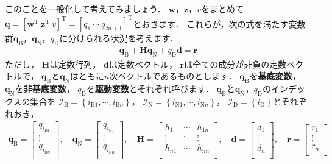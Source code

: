 \documentclass[a4paper]{jsarticle}
\begin{document}
このことを一般化して考えてみましょう．
$\boldsymbol{w}$，$\boldsymbol{z}$，$v$をまとめて
$\boldsymbol{q}=[\boldsymbol{w}^{\mathrm{T}}~\boldsymbol{z}^{\mathrm{T}}~v]^{\mathrm{T}}=[q_{1}~\cdots~q_{2n+1}]^{\mathrm{T}}$とおきます．
これらが，次の式を満たす変数群$\boldsymbol{q}_{\mathrm{B}}$，$\boldsymbol{q}_{\mathrm{N}}$，$q_{\mathrm{D}}$に分けられる状況を考えます．
\begin{align*}
\boldsymbol{q}_{\mathrm{B}}+\boldsymbol{H}\boldsymbol{q}_{\mathrm{N}}+q_{\mathrm{D}}\boldsymbol{d}=\boldsymbol{r}
\end{align*}
ただし，
$\boldsymbol{H}$は定数行列，
$\boldsymbol{d}$は定数ベクトル，
$\boldsymbol{r}$は全ての成分が非負の定数ベクトルで，
$\boldsymbol{q}_{\mathrm{B}}$と$\boldsymbol{q}_{\mathrm{N}}$はともに$n$次ベクトルであるものとします．
$\boldsymbol{q}_{\mathrm{B}}$を{\bf 基底変数}，
$\boldsymbol{q}_{\mathrm{N}}$を{\bf 非基底変数}，
$q_{\mathrm{D}}$を{\bf 駆動変数}とそれぞれ呼びます．
$\boldsymbol{q}_{\mathrm{B}}$と$\boldsymbol{q}_{\mathrm{N}}$，$q_{\mathrm{D}}$のインデックスの集合を
$\mathcal{I}_{\mathrm{B}}=\left\{i_{\mathrm{B}1},\cdots,i_{\mathrm{B}n}\right\}$，
$\mathcal{I}_{\mathrm{N}}=\left\{i_{\mathrm{N}1},\cdots,i_{\mathrm{N}n}\right\}$，
$\mathcal{I}_{\mathrm{D}}=\left\{i_{\mathrm{D}}\right\}$とそれぞれおき，
\begin{align*}
\boldsymbol{q}_{\mathrm{B}}=\begin{bmatrix}
q_{i_{\mathrm{B}1}} \\
 \vdots       \\
q_{i_{\mathrm{B}n}} \\
\end{bmatrix}
,\quad
\boldsymbol{q}_{\mathrm{N}}=\begin{bmatrix}
q_{i_{\mathrm{N}1}} \\
 \vdots       \\
q_{i_{\mathrm{N}n}} \\
\end{bmatrix}
,\quad
\boldsymbol{H}=\begin{bmatrix}
h_{1} & \cdots & h_{1n} \\
 \vdots        & \ddots & \vdots \\
h_{n1} & \cdots & h_{nn} \\
\end{bmatrix}
,\quad
\boldsymbol{d}=\begin{bmatrix}
d_{1} \\
 \vdots       \\
d_{n} \\
\end{bmatrix}
,\quad
\boldsymbol{r}=\begin{bmatrix}
r_{1} \\
 \vdots       \\
r_{n} \\
\end{bmatrix}
\end{align*}
\end{document}

